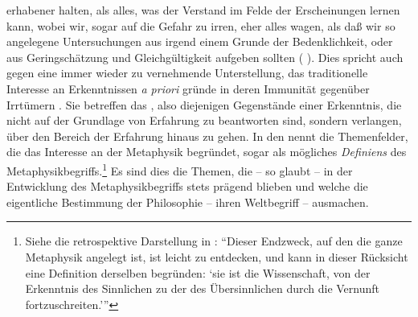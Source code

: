 \begin{nummerierung}
{{erhabener halten, als alles, was der Verstand im Felde der Erscheinungen lernen
kann, wobei wir, sogar auf die Gefahr zu irren, eher alles wagen, als daß wir
so angelegene Untersuchungen aus irgend einem Grunde der Bedenklichkeit, oder
aus Geringschätzung und Gleichgültigkeit aufgeben sollten}
\mkbibparens{\cite[][B~6\,f.,]{Kant:KritikderreinenVernunft2003} \cite[][III:
30.24--31.12]{Kant:GesammelteWerke1900ff.}}. Dies spricht auch gegen eine immer
wieder zu vernehmende Unterstellung, das traditionelle Interesse an
Erkenntnissen \emph{a priori} gründe in deren Immunität gegenüber Irrtümern
\parencite[siehe
z.\,B.][\pno~2\,f.]{Christensen:TestimonyMemoryandtheLimitsoftheaPriori1997}.}
Sie betreffen das , also diejenigen Gegenstände einer
Erkenntnis, die nicht auf der Grundlage von Erfahrung zu beantworten sind,
sondern verlangen, über den Bereich der Erfahrung hinaus zu gehen.
In den  nennt  die
Themenfelder, die das Interesse an der Metaphysik begründet, sogar als mögliches
\emph{Definiens} des Metaphysikbegriffs.\footnote{Siehe die retrospektive
Darstellung in \cite[][A
9\,f.,]{Kant:WelchessinddiewirklichenFortschrittediedieMetaphysikseitLeibnitzensundWolfsZeiteninDeutschlandgemachthat?1900ff.} \cite[][XX: 260.3--6]{Kant:GesammelteWerke1900ff.}: \enquote{Dieser Endzweck,
auf den die ganze Metaphysik angelegt ist, ist leicht zu entdecken, und kann in
dieser Rücksicht eine Definition derselben begründen: \enquote{sie ist die
Wissenschaft, von der Erkenntnis des Sinnlichen zu der des Übersinnlichen durch
die Vernunft fortzuschreiten.}}} Es sind dies die Themen, die -- so glaubt
 -- in der Entwicklung des Metaphysikbegriffs stets prägend
blieben und welche die eigentliche Bestimmung der Philosophie -- ihren
Weltbegriff -- ausmachen.
\end{nummerierung}



